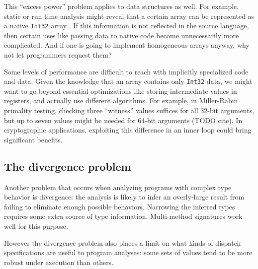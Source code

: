 This ``excess power'' problem applies to data structures as well.
For example, static or run time analysis might reveal that a certain array
can be represented as a native \texttt{Int32} array \cite{Bolz2013}.
If this information is not reflected in the source language, then
certain uses like passing data to native code become unnecessarily more
complicated.
And if one is going to implement homogeneous arrays anyway, why not
let programmers request them?

Some levels of performance are difficult to reach with implicitly
specialized code and data. Given the knowledge that
an array contains only \texttt{Int32} data, we might want to go
beyond essential optimizations like storing intermediate values in
registers, and actually use different algorithms. For example,
in Miller-Rabin primality testing, checking three ``witness'' values
suffices for all 32-bit arguments, but up to seven values might be
needed for 64-bit arguments (TODO cite).
In cryptographic applications, exploiting this difference in an inner loop
could bring significant benefits.


\subsection{The divergence problem}

Another problem that occurs when analyzing programs with complex
type behavior is divergence: the analysis is likely to infer an
overly-large result from failing to eliminate enough possible
behaviors. Narrowing the inferred types requires some extra source
of type information. Multi-method signatures work well for this
purpose.

However the divergence problem also places a limit on what
kinds of dispatch specifications are useful to program analyses:
some sets of values tend to be more robust under execution
than others.



